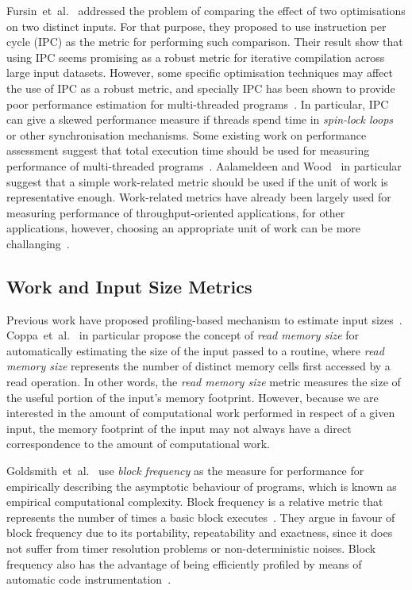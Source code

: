 \documentclass[sigplan,9pt]{acmart}
\newcommand{\etal}{et~al.}
\newcommand{\itercomp}{{iterative compilation}}
\begin{document}
Fursin~\etal~\cite{fursin07} addressed the problem of comparing the effect of two optimisations
on two distinct inputs. For that purpose, they proposed to use instruction per cycle (IPC) as the metric for performing such comparison.
Their result show that using IPC seems promising as a robust metric for {\itercomp}
across large input datasets.
However, 
some specific optimisation techniques may affect the use of IPC as a robust metric, and specially
IPC has been shown to provide poor performance estimation for multi-threaded programs~\cite{alameldeen06,eyerman08}.
In particular, IPC can give a skewed performance measure if threads spend time in \textit{spin-lock loops}
or other synchronisation mechanisms. 
Some existing work on performance assessment suggest that
total execution time should be used for measuring performance of multi-threaded programs~\cite{alameldeen06,eyerman08}.
Aalameldeen and Wood~\cite{alameldeen06} in particular suggest that a simple work-related metric should be used
if the unit of work is representative enough.
Work-related metrics have already been largely used for measuring performance of throughput-oriented applications,
for other applications, however, choosing an appropriate unit of work can be more challanging~\cite{alameldeen06}.

\subsection{Work and Input Size Metrics}

Previous work have proposed profiling-based mechanism to estimate
input sizes~\cite{zaparanuks12,coppa14}.
Coppa~\etal~\cite{coppa14} in particular propose the concept of
\textit{read memory size} for automatically estimating the size of the input
passed to a routine, where \textit{read memory size} represents the number of
distinct memory cells first accessed by a read operation.
In other words, the \textit{read memory size} metric measures the size of the 
useful portion of the input's memory footprint.
However, because we are interested in the amount of computational work performed
in respect of a given input, the memory footprint of the input may not always
have a direct correspondence to  the amount of computational work.

Goldsmith~\etal~\cite{goldsmith07} use \textit{block frequency} as the
measure for performance for empirically describing the asymptotic behaviour
of programs, which is known as empirical computational complexity.
Block frequency is a relative metric that represents the number of times a
basic block executes~\cite{ball94,ball96}. 
They argue in favour of block frequency due to its portability, repeatability
and exactness, since it does not suffer from timer resolution problems or
non-deterministic noises.
Block frequency also has the advantage of being efficiently profiled by means
of automatic code instrumentation~\cite{knuth73,ball94}.
\end{document}
